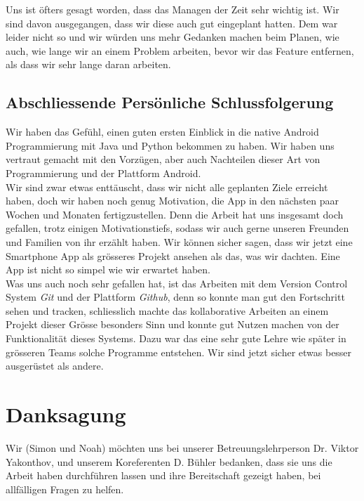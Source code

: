 \documentclass[a4paper,11pt]{article}
\begin{document}
Uns ist öfters gesagt worden, dass das Managen der Zeit sehr wichtig ist. Wir sind davon ausgegangen, dass wir diese auch gut eingeplant hatten. Dem war leider nicht so und wir 
würden uns mehr Gedanken machen beim Planen, wie auch, wie lange wir an einem Problem arbeiten, bevor wir das Feature entfernen, als dass wir sehr lange daran arbeiten. 


\subsection{Abschliessende Persönliche Schlussfolgerung}
Wir haben das Gefühl, einen guten ersten Einblick in die native Android Programmierung mit Java und Python bekommen zu haben. Wir haben uns vertraut gemacht mit den Vorzügen, aber auch Nachteilen dieser Art von Programmierung und der Plattform Android.\\

Wir sind zwar etwas enttäuscht, dass wir nicht alle geplanten Ziele erreicht haben, doch wir haben noch genug Motivation, die App in den nächsten paar Wochen und Monaten fertigzustellen. Denn die Arbeit hat uns insgesamt doch gefallen, trotz einigen Motivationstiefs, sodass wir auch gerne unseren Freunden und Familien von ihr erzählt haben.
Wir können sicher sagen, dass wir jetzt eine Smartphone App als grösseres Projekt ansehen als das, was wir dachten. Eine App ist nicht so simpel wie wir erwartet haben.\\

Was uns auch noch sehr gefallen hat, ist das Arbeiten mit dem Version Control System \textit{Git} und der Plattform \textit{Github}, denn so konnte man gut den Fortschritt sehen und tracken, schliesslich machte das kollaborative Arbeiten an einem Projekt dieser Grösse besonders Sinn und konnte gut Nutzen machen von der Funktionalität dieses Systems.
Dazu war das eine sehr gute Lehre wie später in grösseren Teams solche Programme entstehen. Wir sind jetzt sicher etwas besser ausgerüstet als andere.

\section{Danksagung}
Wir (Simon und Noah) möchten uns bei unserer Betreuungslehrperson Dr. Viktor Yakonthov, und unserem Koreferenten D. Bühler bedanken, dass sie uns die Arbeit haben durchführen lassen und ihre Bereitschaft gezeigt haben, bei allfälligen Fragen zu helfen.


\clearpage
\printglossary
\end{document}
